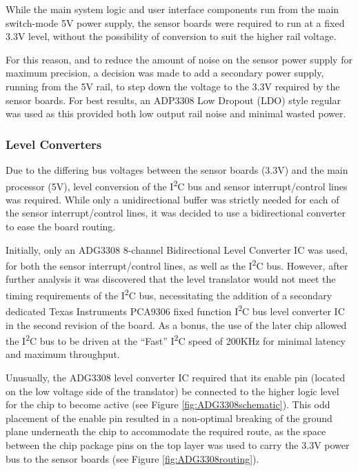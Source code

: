 While the main system logic and user interface components run from the main switch-mode 5V power supply, the sensor boards were required to run at a fixed 3.3V level, without the possibility of conversion to suit the higher rail voltage.

For this reason, and to reduce the amount of noise on the sensor power supply for maximum precision, a decision was made to add a secondary power supply, running from the 5V rail, to step down the voltage to the 3.3V required by the sensor boards. For best results, an ADP3308 Low Dropout (LDO) style regular was used as this provided both low output rail noise and minimal wasted power.

\FloatBarrier
\subsubsection{Level Converters}

Due to the differing bus voltages between the sensor boards (3.3V) and the main processor (5V), level conversion of the I\textsuperscript{2}C bus and sensor interrupt/control lines was required. While only a unidirectional buffer was strictly needed for each of the sensor interrupt/control lines, it was decided to use a bidirectional converter to ease the board routing.

Initially, only an ADG3308 8-channel Bidirectional Level Converter IC was used, for both the sensor interrupt/control lines, as well as the I\textsuperscript{2}C bus. However, after further analysis it was discovered that the level translator would not meet the timing requirements of the I\textsuperscript{2}C bus, necessitating the addition of a secondary dedicated Texas Instruments PCA9306 fixed function I\textsuperscript{2}C bus level converter IC in the second revision of the board. As a bonus, the use of the later chip allowed the I\textsuperscript{2}C bus to be driven at the ``Fast'' I\textsuperscript{2}C speed of 200KHz for minimal latency and maximum throughput.

Unusually, the ADG3308 level converter IC required that its enable pin (located on the low voltage side of the translator) be connected to the higher logic level for the chip to become active (see Figure \ref{fig:ADG3308schematic}). This odd placement of the enable pin resulted in a non-optimal breaking of the ground plane underneath the chip to accommodate the required route, as the space between the chip package pins on the top layer was used to carry the 3.3V power bus to the sensor boards (see Figure \ref{fig:ADG3308routing}).

